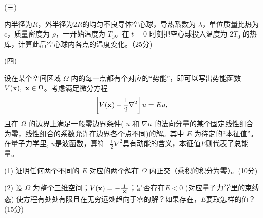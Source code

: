 \documentclass[12pt,CJK]{article}
\begin{document}
\item[(三)]{


  内半径为$R$，外半径为$2R$的均匀不良导体空心球，导热系数为 $\lambda$，单位质量比热为 $c$，质量密度为 $\rho$，一开始温度为 $T_0$。在 $t=0$ 时刻把空心球投入温度为 $2T_0$ 的热库，计算此后空心球内各点的温度变化。（25分)

    {\vskip 2in}

}

\item[(四)]{设在某个空间区域 $\Omega$ 内的每一点都有个对应的“势能”，即可以写出势能函数 $V({\mathbf{x}}),\ {\mathbf{x}}\in \Omega$。考虑满足微分方程
  $$\left[V({\mathbf{x}})-\frac{1}{2}\nabla^2\right] u = E u, $$
  且在 $\Omega$ 的边界上满足一般零边界条件( $u$ 和 $\nabla u$ 的法向分量的某个固定线性组合为零，线性组合的系数允许在边界各个点不同)的解。其中 $E$ 为待定的“本征值”。在量子力学里, $u$是波函数，算符$-\frac{1}{2}\nabla^2$具有动能的含义，本征值$E$则代表了总能量。
  \bitem
\item[(1)]{证明任何两个不同的 $E$ 对应的两个解在 $\Omega$ 内正交（乘积的积分为零）。(10分)}
\item[(2)]{设 $\Omega$ 为整个三维空间；$V({\mathbf{x}}) = -\frac{1}{|{\mathbf{x}}|}$；是否存在$E<0$ (对应量子力学里的束缚态) 使方程有处处有限且在无穷远处趋向于零的解？如果存在，$E$要取怎样的值？ (15分)}  
  \eitem
}

\eitem  





\ech
\end{document}

